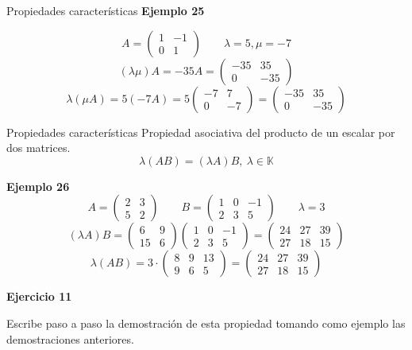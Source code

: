 \documentclass[
  ignorenonframetext,
]{beamer}
\begin{document}
\begin{frame}{Propiedades características}
\protect\hypertarget{propiedades-caracteruxedsticas-23}{}
\textbf{Ejemplo 25}

\[A =\begin{pmatrix}1&-1\\0&1\end{pmatrix}\qquad \lambda=5,\mu=-7\]
\[(\lambda\mu)A = -35A = \begin{pmatrix}-35&35\\0&-35\end{pmatrix}\]
\[\lambda(\mu A)=5(-7A)=5\begin{pmatrix}-7&7\\0&-7\end{pmatrix}=\begin{pmatrix}-35&35\\0&-35\end{pmatrix}\]
\end{frame}

\begin{frame}{Propiedades características}
\protect\hypertarget{propiedades-caracteruxedsticas-24}{}
Propiedad asociativa del producto de un escalar por dos matrices.
\[\lambda(AB) = (\lambda A)B,\ \lambda\in\mathbb{K}\]

\textbf{Ejemplo 26}
\[A = \begin{pmatrix}2&3\\5&2\end{pmatrix}\qquad B=\begin{pmatrix}1&0&-1\\2&3&5\end{pmatrix}\qquad \lambda=3\]
\[(\lambda A)B=\begin{pmatrix}6&9\\15&6\end{pmatrix}\begin{pmatrix}1&0&-1\\2&3&5\end{pmatrix}=\begin{pmatrix}24&27&39\\27&18&15\end{pmatrix}\]
\[\lambda(AB)=3\cdot\begin{pmatrix}8&9&13\\9&6&5\end{pmatrix}=\begin{pmatrix}24&27&39\\27&18&15\end{pmatrix}\]

\textbf{Ejercicio 11}

Escribe paso a paso la demostración de esta propiedad tomando como
ejemplo las demostraciones anteriores.
\end{frame}
\end{document}
